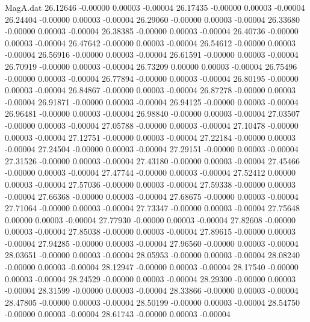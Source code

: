\begin{filecontents}{MagA.dat}
  26.12646   -0.00000    0.00003   -0.00004
  26.17435   -0.00000    0.00003   -0.00004
  26.24404   -0.00000    0.00003   -0.00004
  26.29060   -0.00000    0.00003   -0.00004
  26.33680   -0.00000    0.00003   -0.00004
  26.38385   -0.00000    0.00003   -0.00004
  26.40736   -0.00000    0.00003   -0.00004
  26.47642   -0.00000    0.00003   -0.00004
  26.54612   -0.00000    0.00003   -0.00004
  26.56916   -0.00000    0.00003   -0.00004
  26.61591   -0.00000    0.00003   -0.00004
  26.70919   -0.00000    0.00003   -0.00004
  26.73209    0.00000    0.00003   -0.00004
  26.75496   -0.00000    0.00003   -0.00004
  26.77894   -0.00000    0.00003   -0.00004
  26.80195   -0.00000    0.00003   -0.00004
  26.84867   -0.00000    0.00003   -0.00004
  26.87278   -0.00000    0.00003   -0.00004
  26.91871   -0.00000    0.00003   -0.00004
  26.94125   -0.00000    0.00003   -0.00004
  26.96481   -0.00000    0.00003   -0.00004
  26.98840   -0.00000    0.00003   -0.00004
  27.03507   -0.00000    0.00003   -0.00004
  27.05788   -0.00000    0.00003   -0.00004
  27.10478   -0.00000    0.00003   -0.00004
  27.12751   -0.00000    0.00003   -0.00004
  27.22184   -0.00000    0.00003   -0.00004
  27.24504   -0.00000    0.00003   -0.00004
  27.29151   -0.00000    0.00003   -0.00004
  27.31526   -0.00000    0.00003   -0.00004
  27.43180   -0.00000    0.00003   -0.00004
  27.45466   -0.00000    0.00003   -0.00004
  27.47744   -0.00000    0.00003   -0.00004
  27.52412    0.00000    0.00003   -0.00004
  27.57036   -0.00000    0.00003   -0.00004
  27.59338   -0.00000    0.00003   -0.00004
  27.66368   -0.00000    0.00003   -0.00004
  27.68675   -0.00000    0.00003   -0.00004
  27.71064   -0.00000    0.00003   -0.00004
  27.73347   -0.00000    0.00003   -0.00004
  27.75648    0.00000    0.00003   -0.00004
  27.77930   -0.00000    0.00003   -0.00004
  27.82608   -0.00000    0.00003   -0.00004
  27.85038   -0.00000    0.00003   -0.00004
  27.89615   -0.00000    0.00003   -0.00004
  27.94285   -0.00000    0.00003   -0.00004
  27.96560   -0.00000    0.00003   -0.00004
  28.03651   -0.00000    0.00003   -0.00004
  28.05953   -0.00000    0.00003   -0.00004
  28.08240   -0.00000    0.00003   -0.00004
  28.12947   -0.00000    0.00003   -0.00004
  28.17540   -0.00000    0.00003   -0.00004
  28.24529   -0.00000    0.00003   -0.00004
  28.29300   -0.00000    0.00003   -0.00004
  28.31599   -0.00000    0.00003   -0.00004
  28.33866   -0.00000    0.00003   -0.00004
  28.47805   -0.00000    0.00003   -0.00004
  28.50199   -0.00000    0.00003   -0.00004
  28.54750   -0.00000    0.00003   -0.00004
  28.61743   -0.00000    0.00003   -0.00004

\end{filecontents}
